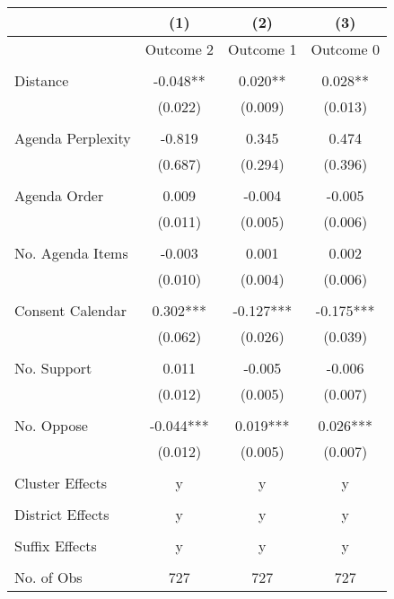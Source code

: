 \begin{tabular}{lccc}
\toprule
 & (1) & (2) & (3) \\
\midrule
 & Outcome 2 & Outcome 1 & Outcome 0 \\
 &  &  &  \\
Distance & -0.048** & 0.020** & 0.028** \\
 & (0.022) & (0.009) & (0.013) \\
 &  &  &  \\
Agenda Perplexity & -0.819 & 0.345 & 0.474 \\
 & (0.687) & (0.294) & (0.396) \\
 &  &  &  \\
Agenda Order & 0.009 & -0.004 & -0.005 \\
 & (0.011) & (0.005) & (0.006) \\
 &  &  &  \\
No. Agenda Items & -0.003 & 0.001 & 0.002 \\
 & (0.010) & (0.004) & (0.006) \\
 &  &  &  \\
Consent Calendar & 0.302*** & -0.127*** & -0.175*** \\
 & (0.062) & (0.026) & (0.039) \\
 &  &  &  \\
No. Support & 0.011 & -0.005 & -0.006 \\
 & (0.012) & (0.005) & (0.007) \\
 &  &  &  \\
No. Oppose & -0.044*** & 0.019*** & 0.026*** \\
 & (0.012) & (0.005) & (0.007) \\
 &  &  &  \\
Cluster Effects & y & y & y \\
 &  &  &  \\
District Effects & y & y & y \\
 &  &  &  \\
Suffix Effects & y & y & y \\
 &  &  &  \\
No. of Obs & 727 & 727 & 727 \\
\bottomrule
\end{tabular}
